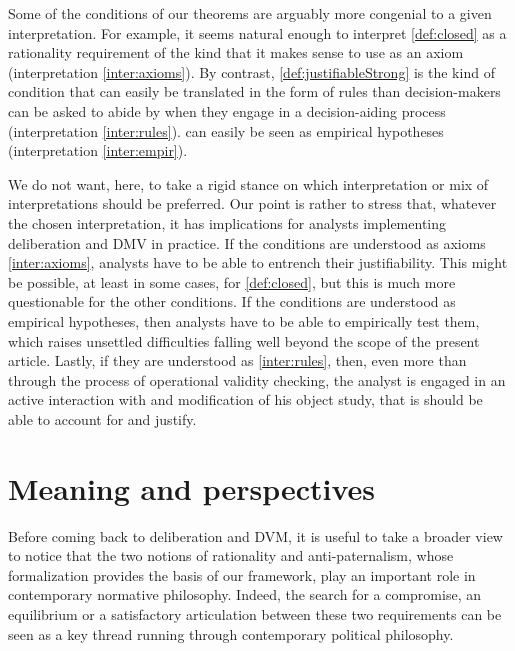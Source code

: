 \documentclass[version=3.21, pagesize, twoside=off, bibliography=totoc, DIV=calc, fontsize=12pt, a4paper, french, english]{scrartcl}
\begin{document}
Some of the conditions of our theorems are arguably more congenial to a given interpretation. For example, it seems natural enough to interpret \cref{def:closed} as a rationality requirement of the kind that it makes sense to use as an axiom (interpretation \ref{inter:axioms}). 
By contrast, \cref{def:justifiableStrong} is the kind of condition that can easily be translated in the form of rules than decision-makers can be asked to abide by when they engage in a decision-aiding process (interpretation \ref{inter:rules}). 
 can easily be seen as empirical hypotheses (interpretation \ref{inter:empir}).

We do not want, here, to take a rigid stance on which interpretation or mix of interpretations should be preferred. Our point is rather to stress that, whatever the chosen interpretation, it has implications for analysts implementing deliberation and DMV in practice. If the conditions are understood as axioms \ref{inter:axioms}, analysts have to be able to entrench their justifiability. This might be possible, at least in some cases, for \cref{def:closed}, but this is much more questionable for the other conditions. If the conditions are understood as empirical hypotheses, then analysts have to be able to empirically test them, which raises unsettled difficulties falling well beyond the scope of the present article. Lastly, if they are understood as \ref{inter:rules}, then, even more than through the process of operational validity checking, the analyst is engaged in an active interaction with and modification of his object study, that is should be able to account for and justify.

\section{Meaning and perspectives}
\label{disc}
Before coming back to deliberation and DVM, it is useful to take a broader view to notice that the two notions of rationality and anti-paternalism, whose formalization provides the basis of our framework, play an important role in contemporary normative philosophy. Indeed, the search for a compromise, an equilibrium or a satisfactory articulation between these two requirements can be seen as a key thread running through contemporary political philosophy.
\end{document}
